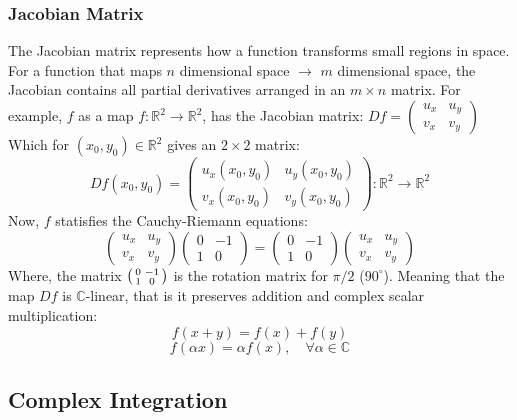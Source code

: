 \documentclass[a4paper, 10pt]{article}
\begin{document}
\subsubsection{Jacobian Matrix}
The Jacobian matrix represents how a function transforms small regions in space. For a function that maps $n$ dimensional space $\to$ $m$ dimensional space,
the Jacobian contains all partial derivatives arranged in an $m \times n$ matrix.
For example, $f$ as a map $f: \mathbb{R}^2 \to \mathbb{R}^2$, has the Jacobian matrix:
$
  Df =
  \begin{pmatrix}
    u_x & u_y \\
    v_x & v_y
  \end{pmatrix}$
Which for $(x_0, y_0) \in \mathbb{R}^2$ gives an $2 \times 2$ matrix:
$$Df(x_0, y_0) =
  \begin{pmatrix}
    u_x(x_0, y_0) & u_y(x_0, y_0) \\
    v_x(x_0, y_0) & v_y(x_0, y_0)
  \end{pmatrix}
  :
  \mathbb{R}^2 \to \mathbb{R}^2
$$
Now, $f$ statisfies the Cauchy-Riemann equations:
$$
  \begin{pmatrix}
    u_x & u_y \\
    v_x & v_y
  \end{pmatrix}
  \begin{pmatrix}
    0 & -1 \\
    1 & 0
  \end{pmatrix}
  =
  \begin{pmatrix}
    0 & -1 \\
    1 & 0
  \end{pmatrix}
  \begin{pmatrix}
    u_x & u_y \\
    v_x & v_y
  \end{pmatrix}
$$
Where, the matrix $\begin{psmallmatrix} 0 & -1 \\ 1 & 0 \end{psmallmatrix}$ is the rotation matrix for $\pi / 2$ ($90^{\circ}$). Meaning that the map $Df$ is $\mathbb{C}$-linear, that is it preserves addition and complex scalar multiplication:
$$f(x + y) = f(x) + f(y)$$
$$f(\alpha x) = \alpha f(x), \quad \forall \alpha \in \mathbb{C}$$

\subsection{Complex Integration}
\end{document}
